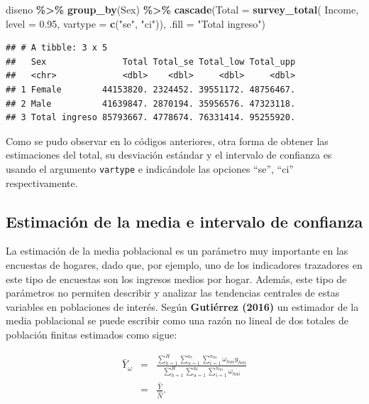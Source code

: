 \documentclass[
  spanish,
  12pt,
]{book}
\newenvironment{Shaded}{\begin{snugshade}}{\end{snugshade}}
\newcommand{\AttributeTok}[1]{\textcolor[rgb]{0.13,0.29,0.53}{#1}}
\newcommand{\FloatTok}[1]{\textcolor[rgb]{0.00,0.00,0.81}{#1}}
\newcommand{\FunctionTok}[1]{\textcolor[rgb]{0.13,0.29,0.53}{\textbf{#1}}}
\newcommand{\NormalTok}[1]{#1}
\newcommand{\SpecialCharTok}[1]{\textcolor[rgb]{0.81,0.36,0.00}{\textbf{#1}}}
\newcommand{\StringTok}[1]{\textcolor[rgb]{0.31,0.60,0.02}{#1}}
\begin{document}
\begin{Shaded}
\begin{Highlighting}[]
\NormalTok{diseno }\SpecialCharTok{\%\textgreater{}\%} \FunctionTok{group\_by}\NormalTok{(Sex) }\SpecialCharTok{\%\textgreater{}\%}
  \FunctionTok{cascade}\NormalTok{(}\AttributeTok{Total =} \FunctionTok{survey\_total}\NormalTok{(}
\NormalTok{    Income, }\AttributeTok{level =} \FloatTok{0.95}\NormalTok{,}
    \AttributeTok{vartype =}  \FunctionTok{c}\NormalTok{(}\StringTok{"se"}\NormalTok{, }\StringTok{"ci"}\NormalTok{)),}
          \AttributeTok{.fill =} \StringTok{"Total ingreso"}\NormalTok{)}
\end{Highlighting}
\end{Shaded}

\begin{verbatim}
## # A tibble: 3 x 5
##   Sex               Total Total_se Total_low Total_upp
##   <chr>             <dbl>    <dbl>     <dbl>     <dbl>
## 1 Female        44153820. 2324452. 39551172. 48756467.
## 2 Male          41639847. 2870194. 35956576. 47323118.
## 3 Total ingreso 85793667. 4778674. 76331414. 95255920.
\end{verbatim}

Como se pudo observar en lo códigos anteriores, otra forma de obtener las estimaciones del total, su desviación estándar y el intervalo de confianza es usando el argumento \texttt{vartype} e indicándole las opciones ``se'', ``ci'' respectivamente.

\subsection{Estimación de la media e intervalo de confianza}\label{estimaciuxf3n-de-la-media-e-intervalo-de-confianza}

La estimación de la media poblacional es un parámetro muy importante en las encuestas de hogares, dado que, por ejemplo, uno de los indicadores trazadores en este tipo de encuestas son los ingresos medios por hogar. Además, este tipo de parámetros no permiten describir y analizar las tendencias centrales de estas variables en poblaciones de interés. Según \textbf{Gutiérrez (2016)} un estimador de la media poblacional se puede escribir como una razón no lineal de dos totales de población finitas estimados como sigue:

\begin{eqnarray*}
\bar{Y}_{\omega} & = & \frac{\sum_{h=1}^{H}\sum_{\alpha=1}^{a_{h}}\sum_{i=1}^{n_{h\alpha}}\omega_{h\alpha i}y_{h\alpha i}}{\sum_{h=1}^{H}\sum_{\alpha=1}^{a_{h}}\sum_{i=1}^{n_{h\alpha}}\omega_{h\alpha i}}\\
 & = & \frac{\hat{Y}}{\hat{N}}.
\end{eqnarray*}
\end{document}
